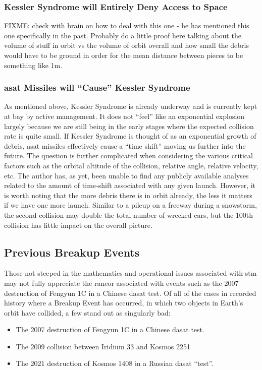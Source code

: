 \subsubsection{Kessler Syndrome will Entirely Deny Access to Space}
FIXME: check with brain on how to deal with this one - he has
mentioned this one specifically in the past.  Probably do a little
proof here talking about the volume of stuff in orbit vs the volume of
orbit overall and how small the debris would have to be ground in
order for the mean distance between pieces to be something like 1m.

\subsubsection{\ac{asat} Missiles will ``Cause'' Kessler Syndrome}
As mentioned above, Kessler Syndrome is already underway and is
currently kept at bay by active management.  It does not ``feel'' like
an exponential explosion largely because we are still being in the
early stages where the expected collision rate is quite small.  If
Kessler Syndrome is thought of as an exponential growth of debris,
\ac{asat} missiles effectively cause a ``time shift'' moving us
further into the future.  The question is further complicated when
considering the various critical factors such as the orbital altitude
of the collision, relative angle, relative velocity, etc.  The author
has, as yet, been unable to find any publicly available analyses
related to the amount of time-shift associated with any given launch.
However, it is worth noting that the more debris there is in orbit
already, the less it matters if we have one more launch.  Similar to a
pileup on a freeway during a snowstorm, the second collision may
double the total number of wrecked cars, but the 100th collision has
little impact on the overall picture.

\subsection{Previous Breakup Events}

Those not steeped in the mathematics and operational issues associated
with \ac{stm} may not fully appreciate the rancor associated with
events such as the 2007 destruction of Fengyun 1C in a Chinese
\ac{dasat} test.  Of all of the cases in recorded history where a
Breakup Event has occurred, in which two objects in Earth's orbit have
collided, a few stand out as singularly bad:

\begin{itemize}

\item The 2007 destruction of Fengyun 1C in a Chinese \ac{dasat} test.

\item The 2009 collision between Iridium 33 and Kosmos 2251

\item The 2021 destruction of Kosmos 1408 in a Russian \ac{dasat} ``test''.

\end{itemize}


